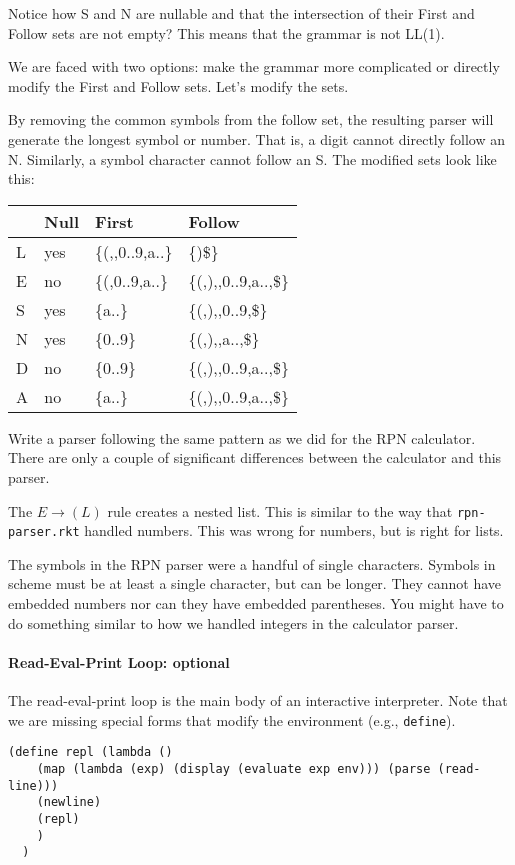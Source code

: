 \documentclass[letterpaper,12pt]{article}
\begin{document}
Notice how S and N are nullable and that the intersection of their First and
Follow sets are not empty?  This means that the grammar is not LL(1).

We are faced with two options: make the grammar more complicated or directly
modify the First and Follow sets.  Let's modify the sets.

By removing the common symbols from the follow set, the resulting parser will
generate the longest symbol or number.  That is, a digit cannot directly follow
an N.  Similarly, a symbol character cannot follow an S.  The modified sets look
like this:

\begin{center}
  \begin{tabular}[t]{l|l|l|l}
    &Null&First&Follow\\\hline
    L&yes&\{(,\textvisiblespace,0..9,a..\}&\{)\$\}\\
    E&no &\{(,0..9,a..\}&\{(,),\textvisiblespace,0..9,a..,\$\}\\
    S&yes&\{a..\}&\{(,),\textvisiblespace,0..9,\$\}\\
    N&yes&\{0..9\}&\{(,),\textvisiblespace,a..,\$\}\\
    D&no &\{0..9\}&\{(,),\textvisiblespace,0..9,a..,\$\}\\
    A&no &\{a..\}&\{(,),\textvisiblespace,0..9,a..,\$\}\\
  \end{tabular}
\end{center}


Write a parser following the same pattern as we did for the RPN calculator.
There are only a couple of significant differences between the calculator and
this parser.

The $E\rightarrow (L)$ rule creates a nested list.  This is similar to the way
that \verb|rpn-parser.rkt| handled numbers.  This was wrong for numbers, but is
right for lists.  

The symbols in the RPN parser were a handful of single characters.  Symbols in
scheme must be at least a single character, but can be longer.  They cannot have
embedded numbers nor can they have embedded parentheses.  You might have to do
something similar to how we handled integers in the calculator parser.  


\paragraph{Read-Eval-Print Loop: optional}
The read-eval-print loop is the main body of an interactive interpreter.  
Note that we are missing special forms that modify the environment (e.g.,
\texttt{define}).
\begin{Verbatim}
(define repl (lambda ()
    (map (lambda (exp) (display (evaluate exp env))) (parse (read-line)))
    (newline)
    (repl)
    )
  )
\end{Verbatim}
\end{document}
